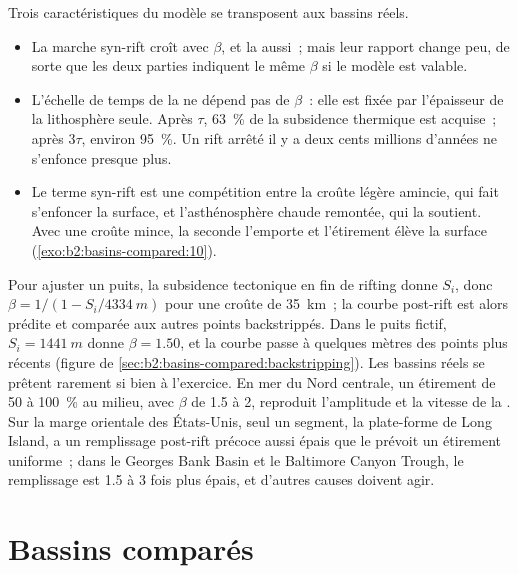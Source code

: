 Trois caractéristiques du modèle se transposent aux bassins réels.
\begin{itemize}
  \item La marche syn-rift croît avec $\beta$, et la  aussi~; mais leur rapport
        change peu, de sorte que les deux parties indiquent le même $\beta$ si le modèle est valable.
  \item L'échelle de temps de la  ne dépend pas de $\beta$~: elle est fixée par l'épaisseur
        de la lithosphère seule. Après $\tau$, \qty{63}{\percent} de la subsidence thermique est acquise~; après
        $3\tau$, environ \qty{95}{\percent}. Un rift arrêté il y a deux cents millions d'années
        ne s'enfonce presque plus.
  \item Le terme syn-rift est une compétition entre la croûte légère amincie, qui fait s'enfoncer la surface, et
        l'asthénosphère chaude remontée, qui la soutient. Avec une croûte mince, la seconde l'emporte et l'étirement
        élève la surface (\cref{exo:b2:basins-compared:10}).
\end{itemize}

Pour ajuster un puits, la subsidence tectonique en fin de rifting donne $S_i$, donc
$\beta = 1/(1 - S_i/\qty{4334}{m})$ pour une croûte de \qty{35}{km}~; la courbe post-rift est alors prédite
et comparée aux autres points backstrippés. Dans le puits fictif, $S_i = \qty{1441}{m}$
donne $\beta = 1.50$, et la courbe passe à quelques mètres des points plus récents (figure de
\cref{sec:b2:basins-compared:backstripping}). Les bassins réels se prêtent rarement si bien à l'exercice.
En mer du Nord centrale, un étirement de 50 à \qty{100}{\percent} au milieu, avec $\beta$ de 1.5 à 2, reproduit l'amplitude
et la vitesse de la . Sur la marge orientale des États-Unis,
seul un segment, la plate-forme de Long Island, a un remplissage post-rift précoce aussi épais que le prévoit
un étirement uniforme~; dans le Georges Bank Basin et le Baltimore Canyon Trough, le remplissage est
1.5 à 3 fois plus épais, et d'autres causes doivent agir.

\section{Bassins comparés}\label{sec:b2:basins-compared:compared}

